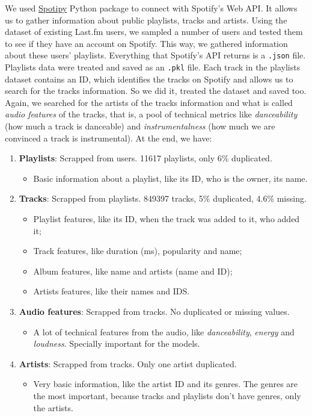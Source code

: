 \documentclass{article}
\begin{document}
We used \href{https://spotipy.readthedocs.io/en/2.13.0/}{Spotipy} Python package
to connect with Spotify's Web API.
It allows us to gather information about public playlists, tracks and artists.
Using the dataset of existing Last.fm users, we sampled a number of users and
tested them to see if they have an account on Spotify. This way, we gathered
information about these users' playlists. Everything that Spotify's API returns
is a \lstinline{.json} file. Playlists data were treated and saved as an
\lstinline{.pkl} file. Each track in the playlists dataset contains an ID, which
identifies the tracks on Spotify and allows us to search for the tracks information.
So we did it, treated the dataset and saved too. Again, we searched for the artists
of the tracks information and what is called \textit{audio features} of the tracks,
that is, a pool of technical metrics like \textit{danceability} (how much a track is
danceable) and \textit{instrumentalness} (how much we are convinced a track is
instrumental). At the end, we have:

\begin{enumerate}
  \item \textbf{Playlists}: Scrapped from users. 11617 playlists, only 6\% duplicated.
  \begin{itemize}
    \item Basic information about a playlist, like its ID, who is the owner, its name.
  \end{itemize}

  \item \textbf{Tracks}: Scrapped from playlists. 849397 tracks, 5\% duplicated, 4.6\% missing.
  \begin{itemize}
    \item Playlist features, like its ID, when the track was added to it, who added it;
    \item Track features, like duration (ms), popularity and name;
    \item Album features, like name and artists (name and ID);
    \item Artists features, like their names and IDS.
  \end{itemize}

  \item \textbf{Audio features}: Scrapped from tracks. No duplicated or missing values.
  \begin{itemize}
    \item A lot of technical features from the audio, like \textit{danceability},
    \textit{energy} and \textit{loudness}. Specially important for the models.
  \end{itemize}

  \item \textbf{Artists}: Scrapped from tracks. Only one artist duplicated.
  \begin{itemize}
    \item Very basic information, like the artist ID and its genres. The genres are
    the most important, because tracks and playlists don't have genres, only the
    artists.
  \end{itemize}
\end{enumerate}
\end{document}
